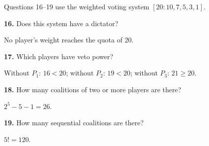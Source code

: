 \documentclass[12pt]{ximera}
\begin{document}
\begin{problem}
Questions 16--19 use the weighted voting system $[20:10,7,5,3,1]$.

\begin{prompt}
\textbf{16.} Does this system have a dictator?
\begin{multipleChoice}
\end{multipleChoice}
\begin{feedback}
No player's weight reaches the quota of $20$.
\end{feedback}
\end{prompt}

\begin{prompt}
\textbf{17.} Which players have veto power?
\begin{multipleChoice}
\end{multipleChoice}
\begin{feedback}
Without $P_1$: $16<20$; without $P_2$: $19<20$; without $P_3$: $21\ge20$.
\end{feedback}
\end{prompt}

\begin{prompt}
\textbf{18.} How many coalitions of two or more players are there?
\begin{multipleChoice}
\end{multipleChoice}
\begin{feedback}
$2^5-5-1=26$.
\end{feedback}
\end{prompt}

\begin{prompt}
\textbf{19.} How many sequential coalitions are there?
\begin{multipleChoice}
\end{multipleChoice}
\begin{feedback}
$5!=120$.
\end{feedback}
\end{prompt}
\end{problem}
\end{document}
